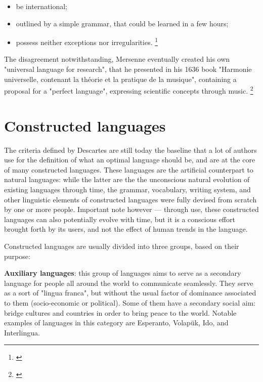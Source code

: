 \begin{itemize}
    \setlength\itemsep{-0.5em}
    \item be international;
    \item outlined by a simple grammar, that could be learned in a few hours;
    \item possess neither exceptions nor irregularities. \footnote{\cite[76-82]{descartes1897oeuvres}}
\end{itemize}

The disagreement notwithstanding, Mersenne eventually created his own "universal language for research", that he presented in his 1636 book
"Harmonie universelle, contenant la th{\'e}orie et la pratique de la musique", containing a proposal for a "perfect language", expressing scientific
concepts through music. \footnote{\cite[Book I, proposition 24]{mersenne1636}}

\section{Constructed languages}

The criteria defined by Descartes are still today the baseline that a lot of authors use for the definition of what an optimal language should be, and are at the core of many
constructed languages. These languages are the artificial counterpart to natural languages: while the latter are the the unconscious natural evolution of existing languages through
time, the grammar, vocabulary, writing system, and other linguistic elements of constructed languages were fully devised from scratch by one or more people. Important note
however --- through use, these constructed languages can also potentially evolve with time, but it is a conscious effort brought forth by its users, and not the effect of human
trends in the language.\newline

Constructed languages are usually divided into three groups, based on their purpose:\newline

\textbf{Auxiliary languages}: this group of languages aims to serve as a secondary language for people all around the world to communicate seamlessly.
They serve as a sort of "lingua franca", but without the usual factor of dominance associated to them (socio-economic or political). Some of them have a secondary social aim:
bridge cultures and countries in order to bring peace to the world. Notable examples of languages in this category are Esperanto, Volapük, Ido, and Interlingua.\newline

